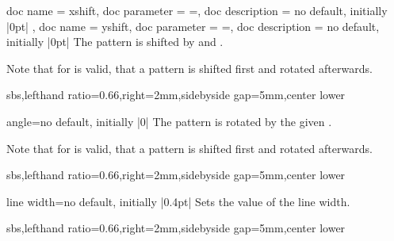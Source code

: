 \documentclass[a4paper,11pt]{article}
\begin{document}
\clearpage


\begin{docPatternKeys}
  {
    {
      doc name        = xshift,
      doc parameter   = {=},
      doc description = {no default, initially |0pt|}
    },
    {
      doc name        = yshift,
      doc parameter   = {=},
      doc description = {no default, initially |0pt|}
    }
  }
  The pattern is shifted by  and .
  \par
  Note that for  is valid, that a pattern is shifted first and rotated afterwards.
\begin{dispExample*}{sbs,lefthand ratio=0.66,right=2mm,sidebyside gap=5mm,center lower}
\end{dispExample*}
\end{docPatternKeys}


\begin{docPatternKey}{angle}{=}{no default, initially |0|}
  The pattern is rotated by the given .
  \par
  Note that for  is valid, that a pattern is shifted first and rotated afterwards.
\begin{dispExample*}{sbs,lefthand ratio=0.66,right=2mm,sidebyside gap=5mm,center lower}
\end{dispExample*}
\end{docPatternKey}



\begin{docPatternKey}{line width}{=}{no default, initially |0.4pt|}
  Sets the  value of the line width.
\begin{dispExample*}{sbs,lefthand ratio=0.66,right=2mm,sidebyside gap=5mm,center lower}
\end{dispExample*}
\end{docPatternKey}
\end{document}
